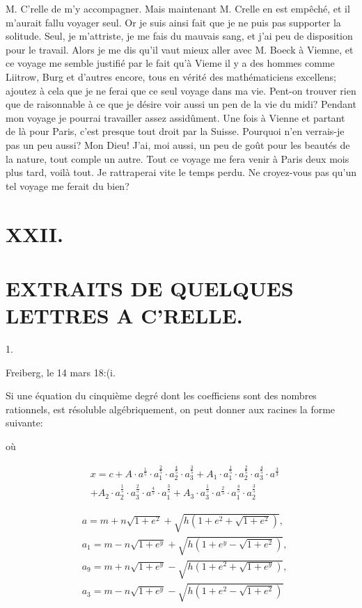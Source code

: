 \documentclass{article}
\begin{document}
M. C'relle de m'y accompagner. Mais maintenant M. Crelle en est empêché, et il m'aurait fallu voyager seul. Or je suis ainsi fait que je ne puis pas supporter la solitude. Seul, je m'attriste, je me fais du mauvais sang, et j'ai peu de disposition pour le travail. Alors je me dis qu'il vaut mieux aller avec M. Boeck à Viemne, et ce voyage me semble justifié par le fait qu'à Vieme il y a des hommes comme Liitrow, Burg et d'autres encore, tous en vérité des mathématiciens excellens; ajoutez à cela que je ne ferai que ce seul voyage dans ma vie. Pent-on trouver rien que de raisonnable à ce que je désire voir aussi un pen de la vie du midi? Pendant mon voyage je pourrai travailler assez assidûment. Une fois à Vienne et partant de là pour Paris, c'est presque tout droit par la Suisse. Pourquoi n'en verrais-je pas un peu aussi? Mon Dieu! J'ai, moi aussi, un peu de goût pour les beautés de la nature, tout comple un autre. Tout ce voyage me fera venir à Paris deux mois plus tard, voilà tout. Je rattraperai vite le temps perdu. Ne croyez-vous pas qu'un tel voyage me ferait du bien?

\section*{XXII.}

\section*{EXTRAITS DE QUELQUES LETTRES A C'RELLE.}

1.

Freiberg, le 14 mars 18:(i.

Si une équation du cinquième degré dont les coefficiens sont des nombres rationnels, est résoluble algébriquement, on peut donner aux racines la forme suivante:

où

\[
\begin{aligned}
& x=c+A \cdot a^{\frac{1}{5}} \cdot a_{1}^{\frac{2}{5}} \cdot a_{2}^{\frac{4}{5}} \cdot a_{3}^{\frac{3}{5}}+A_{1} \cdot a_{1}^{\frac{1}{5}} \cdot a_{2}^{\frac{2}{5}} \cdot a_{3}^{\frac{4}{5}} \cdot a^{\frac{3}{3}} \\
&+A_{2} \cdot a_{2}^{\frac{1}{5}} \cdot a_{3}^{\frac{2}{5}} \cdot a^{\frac{4}{5}} \cdot a_{1}^{\frac{3}{5}}+A_{3} \cdot a_{3}^{\frac{1}{5}} \cdot a^{\frac{2}{5}} \cdot a_{1}^{\frac{4}{5}} \cdot a_{2}^{\frac{3}{5}}
\end{aligned}
\]

\[
\begin{aligned}
& a=m+n \sqrt{1+e^{2}}+\sqrt{h\left(1+e^{2}+\sqrt{1+e^{2}}\right)}, \\
& a_{1}=m-n \sqrt{1+e^{y}}+\sqrt{h\left(1+e^{y}-\sqrt{1+e^{2}}\right)}, \\
& a_{9}=m+n \sqrt{1+e^{y}}-\sqrt{h\left(1+e^{2}+\sqrt{1+e^{y}}\right)}, \\
& a_{3}=m-n \sqrt{1+e^{y}}-\sqrt{h\left(1+e^{2}-\sqrt{1+e^{2}}\right)}
\end{aligned}
\]
\end{document}
